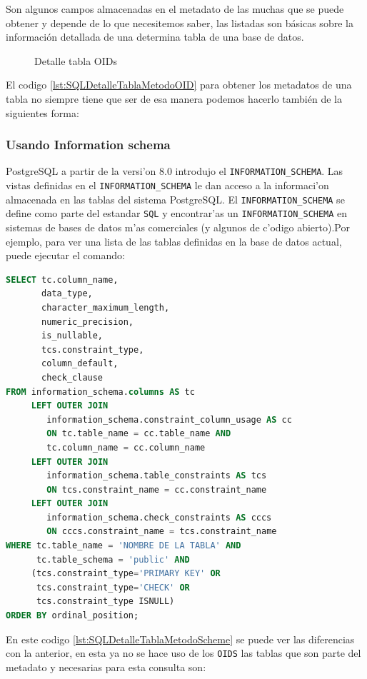Son algunos campos almacenadas en el metadato de las muchas que se puede obtener y depende de lo que necesitemos saber, las listadas son b\'asicas sobre la informaci\'on detallada de una determina tabla de una base de datos.
\begin{figure}[H]
\centering
{}
\caption{Detalle tabla OIDs} \label{fig:Detalle Metodo OID}
\end{figure}
El codigo \ref{lst:SQLDetalleTablaMetodoOID} para obtener los metadatos de una tabla no siempre tiene que ser de esa manera podemos hacerlo tambi\'en de la siguientes forma:
\subsubsection{Usando Information schema}
PostgreSQL  a partir de la versi'on 8.0 introdujo el \texttt{INFORMATION\_SCHEMA}. Las vistas definidas en el \texttt{INFORMATION\_SCHEMA} le dan acceso a la informaci'on almacenada en las tablas del sistema PostgreSQL. El \texttt{INFORMATION\_SCHEMA} se define como parte del estandar \texttt{SQL} y encontrar'as un \texttt{INFORMATION\_SCHEMA} en sistemas de bases de datos m'as comerciales (y algunos de c'odigo abierto).Por ejemplo, para ver una lista de las tablas definidas en la base de datos actual, puede ejecutar el comando:

\begin{lstlisting}[caption={Query para detalle obtener el detalle de una tabla information scheme},label={lst:SQLDetalleTablaMetodoScheme},language=sql]
SELECT tc.column_name,
       data_type,
       character_maximum_length,
       numeric_precision,
       is_nullable,
       tcs.constraint_type,
       column_default,
       check_clause
FROM information_schema.columns AS tc
     LEFT OUTER JOIN
        information_schema.constraint_column_usage AS cc
     	ON tc.table_name = cc.table_name AND
        tc.column_name = cc.column_name
     LEFT OUTER JOIN
        information_schema.table_constraints AS tcs
     	ON tcs.constraint_name = cc.constraint_name
     LEFT OUTER JOIN
        information_schema.check_constraints AS cccs
     	ON cccs.constraint_name = tcs.constraint_name
WHERE tc.table_name = 'NOMBRE DE LA TABLA' AND
      tc.table_schema = 'public' AND
     (tcs.constraint_type='PRIMARY KEY' OR 
      tcs.constraint_type='CHECK' OR 
      tcs.constraint_type ISNULL)
ORDER BY ordinal_position;
\end{lstlisting}
En este codigo \ref{lst:SQLDetalleTablaMetodoScheme} se puede ver las diferencias con la anterior, en esta ya no se hace uso de los \texttt{OIDS} las tablas que son parte del metadato y necesarias para esta consulta son:

